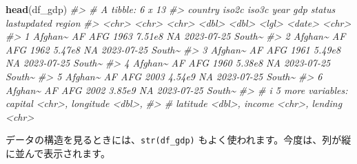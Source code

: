 \documentclass[
  xelatex, ja=standard]{bxjsbook}
\newenvironment{Shaded}{\begin{snugshade}}{\end{snugshade}}
\newcommand{\CommentTok}[1]{\textcolor[rgb]{0.56,0.35,0.01}{\textit{#1}}}
\newcommand{\FunctionTok}[1]{\textcolor[rgb]{0.13,0.29,0.53}{\textbf{#1}}}
\newcommand{\NormalTok}[1]{#1}
\theoremstyle{definition}
\theoremstyle{definition}
\theoremstyle{definition}
\theoremstyle{definition}
\theoremstyle{remark}
\begin{document}
\begin{Shaded}
\begin{Highlighting}[]
\FunctionTok{head}\NormalTok{(df\_gdp)}
\CommentTok{\#\textgreater{} \# A tibble: 6 x 13}
\CommentTok{\#\textgreater{}   country iso2c iso3c  year    gdp status lastupdated region}
\CommentTok{\#\textgreater{}   \textless{}chr\textgreater{}   \textless{}chr\textgreater{} \textless{}chr\textgreater{} \textless{}dbl\textgreater{}  \textless{}dbl\textgreater{} \textless{}lgl\textgreater{}  \textless{}date\textgreater{}      \textless{}chr\textgreater{} }
\CommentTok{\#\textgreater{} 1 Afghan\textasciitilde{} AF    AFG    1963 7.51e8 NA     2023{-}07{-}25  South\textasciitilde{}}
\CommentTok{\#\textgreater{} 2 Afghan\textasciitilde{} AF    AFG    1962 5.47e8 NA     2023{-}07{-}25  South\textasciitilde{}}
\CommentTok{\#\textgreater{} 3 Afghan\textasciitilde{} AF    AFG    1961 5.49e8 NA     2023{-}07{-}25  South\textasciitilde{}}
\CommentTok{\#\textgreater{} 4 Afghan\textasciitilde{} AF    AFG    1960 5.38e8 NA     2023{-}07{-}25  South\textasciitilde{}}
\CommentTok{\#\textgreater{} 5 Afghan\textasciitilde{} AF    AFG    2003 4.54e9 NA     2023{-}07{-}25  South\textasciitilde{}}
\CommentTok{\#\textgreater{} 6 Afghan\textasciitilde{} AF    AFG    2002 3.85e9 NA     2023{-}07{-}25  South\textasciitilde{}}
\CommentTok{\#\textgreater{} \# i 5 more variables: capital \textless{}chr\textgreater{}, longitude \textless{}dbl\textgreater{},}
\CommentTok{\#\textgreater{} \#   latitude \textless{}dbl\textgreater{}, income \textless{}chr\textgreater{}, lending \textless{}chr\textgreater{}}
\end{Highlighting}
\end{Shaded}

データの構造を見るときには、\texttt{str(df\_gdp)} もよく使われます。今度は、列が縦に並んで表示されます。
\end{document}

